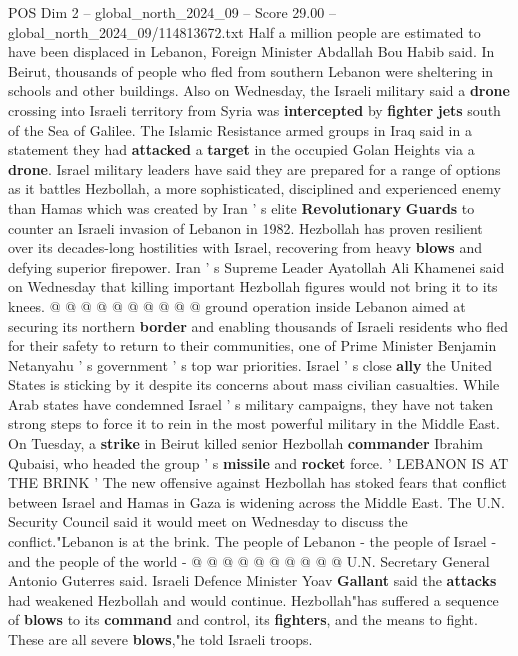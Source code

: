 \begin{textsample}{POS Dim 2 – global\_north\_2024\_09 – Score 29.00 – global\_north\_2024\_09/114813672.txt}
Half a million people are estimated to have been displaced in Lebanon, Foreign Minister Abdallah Bou Habib said.
In Beirut, thousands of people who fled from southern Lebanon were sheltering in schools and other buildings.
Also on Wednesday, the Israeli military said a \textbf{drone} crossing into Israeli territory from Syria was \textbf{intercepted} by \textbf{fighter} \textbf{jets} south of the Sea of Galilee.
The Islamic Resistance armed groups in Iraq said in a statement they had \textbf{attacked} a \textbf{target} in the occupied Golan Heights via a \textbf{drone}.
Israel military leaders have said they are prepared for a range of options as it battles Hezbollah, a more sophisticated, disciplined and experienced enemy than Hamas which was created by Iran ' s elite \textbf{Revolutionary} \textbf{Guards} to counter an Israeli invasion of Lebanon in 1982.
Hezbollah has proven resilient over its decades-long hostilities with Israel, recovering from heavy \textbf{blows} and defying superior firepower.
Iran ' s Supreme Leader Ayatollah Ali Khamenei said on Wednesday that killing important Hezbollah figures would not bring it to its knees. @ @ @ @ @ @ @ @ @ @ ground operation inside Lebanon aimed at securing its northern \textbf{border} and enabling thousands of Israeli residents who fled for their safety to return to their communities, one of Prime Minister Benjamin Netanyahu ' s government ' s top war priorities.
Israel ' s close \textbf{ally} the United States is sticking by it despite its concerns about mass civilian casualties.
While Arab states have condemned Israel ' s military campaigns, they have not taken strong steps to force it to rein in the most powerful military in the Middle East.
On Tuesday, a \textbf{strike} in Beirut killed senior Hezbollah \textbf{commander} Ibrahim Qubaisi, who headed the group ' s \textbf{missile} and \textbf{rocket} force. ' LEBANON IS AT THE BRINK ' The new offensive against Hezbollah has stoked fears that conflict between Israel and Hamas in Gaza is widening across the Middle East.
The U.N.
Security Council said it would meet on Wednesday to discuss the conflict."Lebanon is at the brink.
The people of Lebanon - the people of Israel - and the people of the world - @ @ @ @ @ @ @ @ @ @ U.N.
Secretary General Antonio Guterres said.
Israeli Defence Minister Yoav \textbf{Gallant} said the \textbf{attacks} had weakened Hezbollah and would continue.
Hezbollah"has suffered a sequence of \textbf{blows} to its \textbf{command} and control, its \textbf{fighters}, and the means to fight.
These are all severe \textbf{blows},"he told Israeli troops.

\end{textsample}
